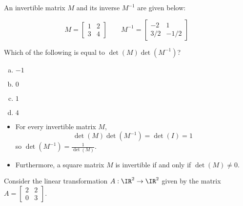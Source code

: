 \begin{applicationActivities}

\begin{activity}{5}
  An invertible matrix \(M\) and its inverse \(M^{-1}\) are given below:
 
  \[
    M=\begin{bmatrix}1&2\\3&4\end{bmatrix}
  \hspace{2em}
    M^{-1}=\begin{bmatrix}-2&1\\3/2&-1/2\end{bmatrix}
  \]

\vspace{1em}

  Which of the following is equal to \(\det(M)\det(M^{-1})\)?

\begin{enumerate}[a)]
\item \(-1\)
\item \(0\)
\item \(1\)
\item \(4\)
\end{enumerate}
\end{activity}

\begin{fact}
  \begin{itemize}
\item   For every invertible matrix \(M\),
  \[
    \det(M)\det(M^{-1})= \det(I)=1
  \]
  so \(\det(M^{-1})=\frac{1}{\det(M)}\).

\item  Furthermore,
  a square matrix \(M\) is invertible if and only if \(\det(M)\not=0\).
  \end{itemize}
\end{fact}

\begin{observation}
Consider the linear transformation \(A : \IR^2 \rightarrow \IR^2\) 
given by the matrix \(A = \begin{bmatrix} 2 & 2 \\ 0 & 3 \end{bmatrix}\).


\end{observation}
\end{applicationActivities}
